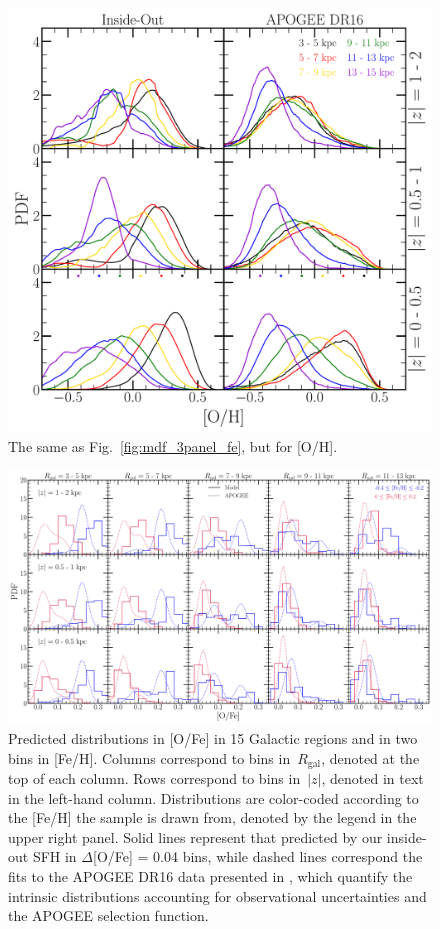 \documentclass[fleqn, usenatbib]{mnras}
\begin{document}
\begin{figure} 
\centering 
\includegraphics[scale = 0.34]{mdf_3panel_o.pdf} 
\caption{The same as Fig.~\ref{fig:mdf_3panel_fe}, but for [O/H].} 
\label{fig:mdf_3panel_o} 
\end{figure} 

\begin{figure} 
\centering 
\includegraphics[scale = 0.32]{ofe_mdfs.pdf} 
\caption{Predicted distributions in [O/Fe] in 15 Galactic regions and in two 
bins in [Fe/H]. Columns correspond to bins in~$R_\text{gal}$, denoted at the 
top of each column. Rows correspond to bins in~$\left|z\right|$, denoted in 
text in the left-hand column. Distributions are color-coded according to the 
[Fe/H] the sample is drawn from, denoted by the legend in the upper right 
panel. Solid lines represent that predicted by our inside-out SFH in 
$\Delta$[O/Fe] = 0.04 bins, while dashed lines correspond the fits to the 
APOGEE DR16 data presented in \citet{Vincenzo2021}, which quantify the 
intrinsic distributions accounting for observational uncertainties and the 
APOGEE selection function. }
\label{fig:ofe_mdfs_insideout} 
\end{figure} 
\end{document}

